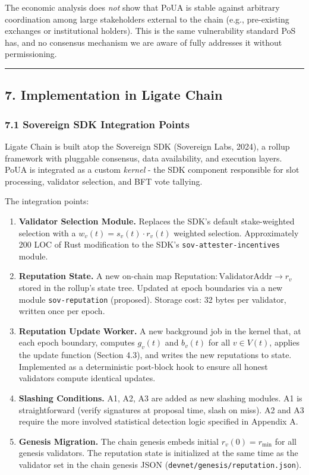 \documentclass[
  11pt,
]{article}
\begin{document}
The economic analysis does \emph{not} show that PoUA is stable against
arbitrary coordination among large stakeholders external to the chain
(e.g., pre-existing exchanges or institutional holders). This is the
same vulnerability standard PoS has, and no consensus mechanism we are
aware of fully addresses it without permissioning.

\begin{center}\rule{0.5\linewidth}{0.5pt}\end{center}

\subsection{7. Implementation in Ligate
Chain}\label{implementation-in-ligate-chain}

\subsubsection{7.1 Sovereign SDK Integration
Points}\label{sovereign-sdk-integration-points}

Ligate Chain is built atop the Sovereign SDK (Sovereign Labs, 2024), a
rollup framework with pluggable consensus, data availability, and
execution layers. PoUA is integrated as a custom \emph{kernel} - the SDK
component responsible for slot processing, validator selection, and BFT
vote tallying.

The integration points:

\begin{enumerate}
\def\labelenumi{\arabic{enumi}.}
\item
  \textbf{Validator Selection Module.} Replaces the SDK's default
  stake-weighted selection with a \(w_v(t) = s_v(t) \cdot r_v(t)\)
  weighted selection. Approximately 200 LOC of Rust modification to the
  SDK's \texttt{sov-attester-incentives} module.
\item
  \textbf{Reputation State.} A new on-chain map
  \(\text{Reputation}: \text{ValidatorAddr} \to r_v\) stored in the
  rollup's state tree. Updated at epoch boundaries via a new module
  \texttt{sov-reputation} (proposed). Storage cost: 32 bytes per
  validator, written once per epoch.
\item
  \textbf{Reputation Update Worker.} A new background job in the kernel
  that, at each epoch boundary, computes \(g_v(t)\) and \(b_v(t)\) for
  all \(v \in V(t)\), applies the update function (Section 4.3), and
  writes the new reputations to state. Implemented as a deterministic
  post-block hook to ensure all honest validators compute identical
  updates.
\item
  \textbf{Slashing Conditions.} A1, A2, A3 are added as new slashing
  modules. A1 is straightforward (verify signatures at proposal time,
  slash on miss). A2 and A3 require the more involved statistical
  detection logic specified in Appendix A.
\item
  \textbf{Genesis Migration.} The chain genesis embeds initial
  \(r_v(0) = r_{\min}\) for all genesis validators. The reputation state
  is initialized at the same time as the validator set in the chain
  genesis JSON (\texttt{devnet/genesis/reputation.json}).
\end{enumerate}
\end{document}
